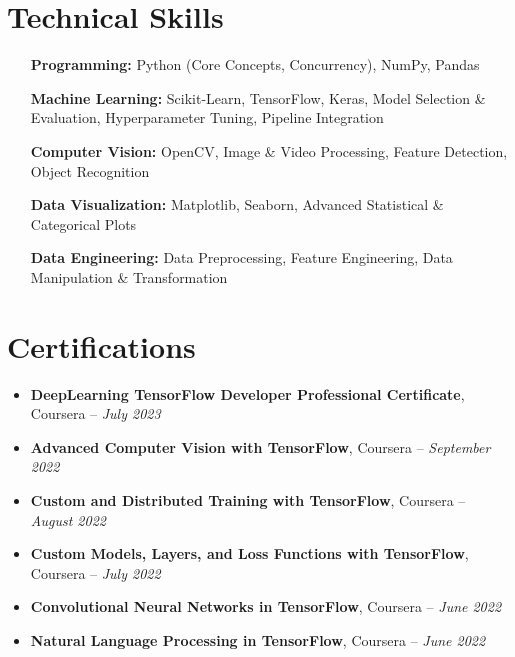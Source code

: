 \documentclass[10pt, a4paper]{article}
\begin{document}

\section{Technical Skills}
\begin{itemize}[leftmargin=4cm, labelwidth=3.8cm, labelsep=0.2cm, align=left, noitemsep]
    \item[\textbf{Programming:}] Python (Core Concepts, Concurrency), NumPy, Pandas
    \item[\textbf{Machine Learning:}] Scikit-Learn, TensorFlow, Keras, Model Selection \& Evaluation, Hyperparameter Tuning, Pipeline Integration
    \item[\textbf{Computer Vision:}] OpenCV, Image \& Video Processing, Feature Detection, Object Recognition
    \item[\textbf{Data Visualization:}] Matplotlib, Seaborn, Advanced Statistical \& Categorical Plots
    \item[\textbf{Data Engineering:}] Data Preprocessing, Feature Engineering, Data Manipulation \& Transformation
\end{itemize}


\section{Certifications}
\begin{itemize}[leftmargin=1.5em, noitemsep, topsep=0.5ex]
    \item \textbf{DeepLearning TensorFlow Developer Professional Certificate}, Coursera -- \textit{July 2023}
    \item \textbf{Advanced Computer Vision with TensorFlow}, Coursera -- \textit{September 2022}
    \item \textbf{Custom and Distributed Training with TensorFlow}, Coursera -- \textit{August 2022}
    \item \textbf{Custom Models, Layers, and Loss Functions with TensorFlow}, Coursera -- \textit{July 2022}
    \item \textbf{Convolutional Neural Networks in TensorFlow}, Coursera -- \textit{June 2022}
    \item \textbf{Natural Language Processing in TensorFlow}, Coursera -- \textit{June 2022}
\end{itemize}
\end{document}
